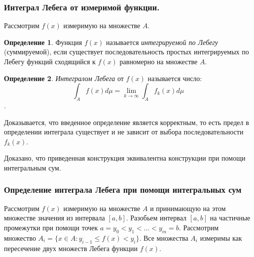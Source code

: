 \documentclass[14pt,a4paper]{extarticle}
\theoremstyle{definition}
\newtheorem{definition}{Определение}[section]
\theoremstyle{remark}
\renewcommand{\[}{\begin{dmath*}[compact]}
\renewcommand{\]}{\end{dmath*}}
\begin{document}
\subsubsection{Интеграл Лебега от измеримой функции.}

Рассмотрим $f(x)$ измеримую на множестве $A$.

\begin{definition}
  Функция $f(x)$ называется \textit{интегрируемой по Лебегу} (суммируемой),
  если существует последовательность простых интегрируемых по Лебегу функций
  сходящийся к $f(x)$ равномерно на множестве $A$.
\end{definition}

\begin{definition}
  \textit{Интегралом Лебега} от $f(x)$ называется число:
  \[\int_A f(x) d\mu = \lim_{k \to \infty} \int_A f_k(x) d\mu\].
\end{definition}

Доказывается, что введенное определение является корректным,
то есть предел в определении интеграла существует и не зависит
от выбора последовательности $f_k(x)$.

Доказано, что приведенная конструкция эквивалентна конструкции
при помощи интегральным сум.

\subsubsection{Определение интеграла Лебега при помощи интегральных сум}

Рассмотрим $f(x)$ измеримую на множестве $A$ и принимающую на этом
множестве значения из интервала $[a,b]$.
Разобьем интервал $[a,b]$ на частичные промежутки при помощи точек
$a=y_0 < y_1 < \dots < y_m = b$.
Рассмотрим множество $A_i = \{x \in A: y_{i-1} \leq f(x) < y_i\}$.
Все множества $A_i$ измеримы как пересечение
двух множеств Лебега функции $f(x)$.
\end{document}
